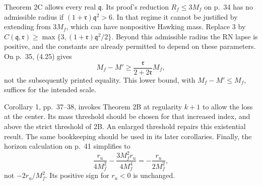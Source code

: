 \documentclass[10pt]{article}
\begin{document}
Theorem 2C allows every real \(\mathfrak q\). Its proof’s reduction \(R_f\leq3M_f\) on p. 34 has no admissible radius if \((1+\mathfrak r)\mathfrak q^2>6\). In that regime it cannot be justified by extending from \(3M_f\), which can have nonpositive Hawking mass. Replace \(3\) by \(C(\mathfrak q,\mathfrak r)\geq
\max\{3,(1+\mathfrak r)\mathfrak q^2/2\}\). Beyond this admissible radius the RN lapse is positive, and the constants are already permitted to depend on these parameters. On p. 35, (4.25) gives \[M_f-M'\geq\frac{\mathfrak r}{2+2\mathfrak r}M_f,\] not the subsequently printed equality. This lower bound, with \(M_f-M'\leq M_f\), suffices for the intended scale.\par
Corollary 1, pp. 37–38, invokes Theorem 2B at regularity \(k+1\) to allow the loss at the center. Its mass threshold should be chosen for that increased index, and above the strict threshold of 2B. An enlarged threshold repairs this existential result. The same bookkeeping should be used in its later corollaries. Finally, the horizon calculation on p. 41 simplifies to \[\frac{r_u}{4M_f^2}
       -\frac{3M_f^2r_u}{4M_f^4}
       =-\frac{r_u}{2M_f^2},\] not \(-2r_u/M_f^2\). Its positive sign for \(r_u<0\) is unchanged.\par
\end{document}
